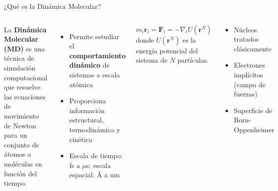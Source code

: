 \documentclass[aspectratio=169, 10pt]{beamer}
\begin{document}
\begin{frame}{¿Qué es la Dinámica Molecular?}
\begin{columns}[T]
\begin{tcolorbox}[definitionbox, title={Definición}]
La \textbf{Dinámica Molecular (MD)} es una técnica de simulación computacional que resuelve las ecuaciones de movimiento de Newton para un conjunto de átomos o moléculas en función del tiempo.
\end{tcolorbox}
\vspace{0.5em}
\begin{itemize}
  \item Permite estudiar el \textbf{comportamiento dinámico} de sistemas a escala atómica
  \item Proporciona información estructural, termodinámica y cinética
  \item Escala de tiempo: fs a $\mu$s; escala espacial: Å a nm
\end{itemize}

\begin{tcolorbox}[formulabox, title={Ecuación de Newton}]
\[
m_i \ddot{\mathbf{r}}_i = \mathbf{F}_i = -\nabla_i U(\mathbf{r}^N)
\]
\small
donde $U(\mathbf{r}^N)$ es la energía potencial del sistema de $N$ partículas.
\end{tcolorbox}
\vspace{0.3em}
\begin{tcolorbox}[warningbox, title={Hipótesis clave}]
\small
\begin{itemize}
  \item Núcleos tratados clásicamente
  \item Electrones implícitos (campo de fuerzas)
  \item Superficie de Born-Oppenheimer
\end{itemize}
\end{tcolorbox}
\end{columns}
\end{frame}
\end{document}
